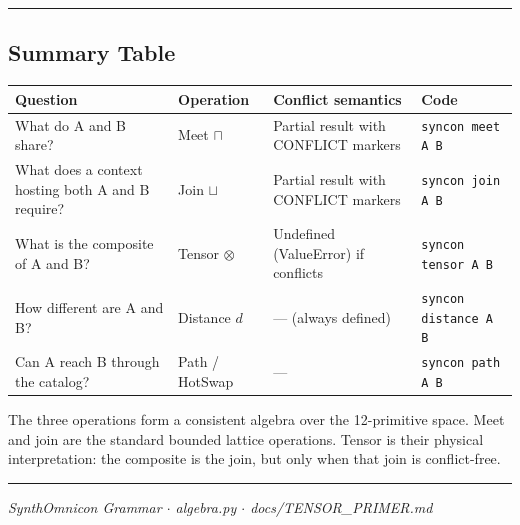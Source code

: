 \documentclass[11pt,a4paper]{article}
\begin{document}
\begin{center}
\rule{0.5\textwidth}{0.4pt}
\end{center}

\subsection{Summary Table}

\begin{table}[htbp]
\centering
\small
{}
\begin{tabularx}{\textwidth}{>{\centering\arraybackslash}X >{\centering\arraybackslash}X >{\centering\arraybackslash}X >{\centering\arraybackslash}X}
\toprule
\rowcolor{gray!25}\textbf{Question} & \textbf{Operation} & \textbf{Conflict semantics} & \textbf{Code} \\
\midrule
\rowcolors{1}{white}{gray!10}
What do A and B share? & Meet $\sqcap$ & Partial result with CONFLICT markers & \texttt{syncon meet A B} \\
What does a context hosting both A and B require? & Join $\sqcup$ & Partial result with CONFLICT markers & \texttt{syncon join A B} \\
What is the composite of A and B? & Tensor $\otimes$ & Undefined (ValueError) if conflicts & \texttt{syncon tensor A B} \\
How different are A and B? & Distance $d$ & --- (always defined) & \texttt{syncon distance A B} \\
Can A reach B through the catalog? & Path / HotSwap & --- & \texttt{syncon path A B} \\
\bottomrule
\end{tabularx}
\end{table}

The three operations form a consistent algebra over the 12-primitive space. Meet and join are the standard bounded lattice operations. Tensor is their physical interpretation: the composite is the join, but only when that join is conflict-free.

\begin{center}
\rule{0.5\textwidth}{0.4pt}
\end{center}

\emph{SynthOmnicon Grammar $\cdot$ algebra.py $\cdot$ docs/TENSOR\_PRIMER.md}
\end{document}

